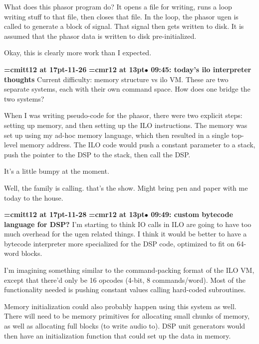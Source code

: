 What does this phasor program do? It opens a file for writing, runs a loop writing stuff to that file, then closes that file. In the loop, the phasor ugen is called to generate a block of signal. That signal then gets written to disk. It is assumed that the phasor data is written to disk pre-initialized.
\par

Okay, this is clearly more work than I expected.
\par

{\medskip\noindent\bf\font\titlefont=cmitt12 at 17pt-11-26}\medskip
{\smallskip\noindent\bf\font\titlefont=cmr12 at 13pt\titlefont $\bullet$ 09:45: today's ilo interpreter thoughts}\smallskip
Current difficulty: memory structure vs ilo VM. These are two separate systems, each with their own command space. How does one bridge the two systems?
\par

When I was writing pseudo-code for the phasor, there were two explicit steps: setting up memory, and then setting up the ILO instructions. The memory was set up using my ad-hoc memory language, which then resulted in a single top-level memory address. The ILO code would push a constant parameter to a stack, push the pointer to the DSP to the stack, then call the DSP.
\par

It's a little bumpy at the moment.
\par

Well, the family is calling. that's the show. Might bring pen and paper with me today to the house.
\par

{\medskip\noindent\bf\font\titlefont=cmitt12 at 17pt-11-28}\medskip
{\smallskip\noindent\bf\font\titlefont=cmr12 at 13pt\titlefont $\bullet$ 09:49: custom bytecode language for DSP?}\smallskip
I'm starting to think IO calls in ILO are going to have too much overhead for the ugen related things. I think it would be better to have a bytecode interpreter more specialized for the DSP code, optimized to fit on 64-word blocks.
\par

I'm imagining something similar to the command-packing format of the ILO VM, except that there'd only be 16 opcodes (4-bit, 8 commands/word). Most of the functionality needed is pushing constant values calling hard-coded subroutines.
\par

Memory initialization could also probably happen using this system as well. There will need to be memory primitives for allocating small chunks of memory, as well as allocating full blocks (to write audio to). DSP unit generators would then have an initialization function that could set up the data in memory.
\par

